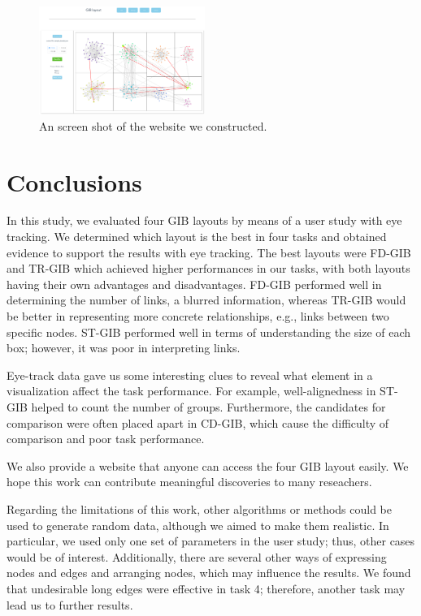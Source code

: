 \documentclass{vgtc}                          %
\begin{document}
\begin{figure}
  \begin{center}
    \includegraphics[width=0.48\textwidth]{pictures/website.png}
    \caption{An screen shot of the website we constructed.}
    \label{website}
  \end{center}
\end{figure}

%
\section{Conclusions}
%

In this study, we evaluated four GIB layouts by means of a user study with eye tracking.
We determined which layout is the best in four tasks and obtained evidence to support the results with eye tracking.
The best layouts were FD-GIB and TR-GIB which achieved higher performances in our tasks, with both layouts having their own advantages and disadvantages.
FD-GIB performed well in determining the number of links, a blurred information, whereas TR-GIB would be better in representing more concrete relationships, e.g., links between two specific nodes.
ST-GIB performed well in terms of understanding the size of each box; however, it was poor in interpreting links.

Eye-track data gave us some interesting clues to reveal what element in a visualization affect the task performance.
For example, well-alignedness in ST-GIB helped to count the number of groups.
Furthermore, the candidates for comparison were often placed apart in CD-GIB, which cause the difficulty of comparison and poor task performance.

We also provide a website that anyone can access the four GIB layout easily.
We hope this work can contribute meaningful discoveries to many reseachers.

Regarding the limitations of this work, other algorithms or methods could be used to generate random data, although we aimed to make them realistic.
In particular, we used only one set of parameters in the user study; thus, other cases would be of interest.
Additionally, there are several other ways of expressing nodes and edges and arranging nodes, which may influence the results.
We found that undesirable long edges were effective in task 4; therefore, another task may lead us to further results.
\end{document}
